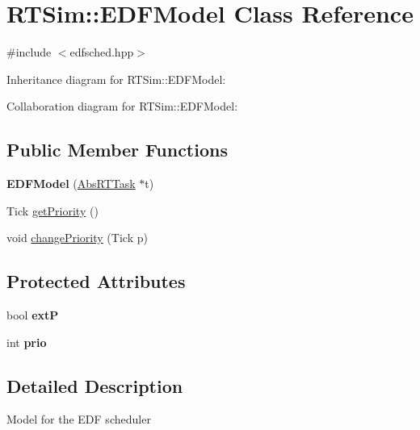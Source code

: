 \hypertarget{classRTSim_1_1EDFModel}{}\section{R\+T\+Sim\+:\+:E\+D\+F\+Model Class Reference}
\label{classRTSim_1_1EDFModel}


{\ttfamily \#include $<$edfsched.\+hpp$>$}



Inheritance diagram for R\+T\+Sim\+:\+:E\+D\+F\+Model\+:


Collaboration diagram for R\+T\+Sim\+:\+:E\+D\+F\+Model\+:
\subsection*{Public Member Functions}
\begin{DoxyCompactItemize}
\item 
{\bfseries E\+D\+F\+Model} (\hyperlink{classRTSim_1_1AbsRTTask}{Abs\+R\+T\+Task} $\ast$t)\hypertarget{classRTSim_1_1EDFModel_a5d40859a9e0a2ef428075e83b4b435d8}{}\label{classRTSim_1_1EDFModel_a5d40859a9e0a2ef428075e83b4b435d8}

\item 
Tick \hyperlink{classRTSim_1_1EDFModel_aada80319dd15514020441fd2087c213d}{get\+Priority} ()
\item 
void \hyperlink{classRTSim_1_1EDFModel_a07b84ff52e279a42f171878ea44d52bf}{change\+Priority} (Tick p)
\end{DoxyCompactItemize}
\subsection*{Protected Attributes}
\begin{DoxyCompactItemize}
\item 
bool {\bfseries extP}\hypertarget{classRTSim_1_1EDFModel_a7cb57b1dd933bc35284731f53761e816}{}\label{classRTSim_1_1EDFModel_a7cb57b1dd933bc35284731f53761e816}

\item 
int {\bfseries prio}\hypertarget{classRTSim_1_1EDFModel_a112a6c850aa9973549888d2680eeca6c}{}\label{classRTSim_1_1EDFModel_a112a6c850aa9973549888d2680eeca6c}

\end{DoxyCompactItemize}


\subsection{Detailed Description}
Model for the E\+DF scheduler 

